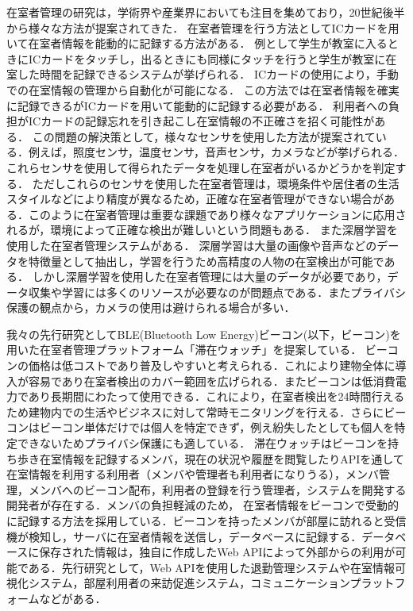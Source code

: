 在室者管理の研究は，学術界や産業界においても注目を集めており，20世紀後半から様々な方法が提案されてきた．
在室者管理を行う方法としてICカードを用いて在室者情報を能動的に記録する方法がある．
例として学生が教室に入るときにICカードをタッチし，出るときにも同様にタッチを行うと学生が教室に在室した時間を記録できるシステムが挙げられる．
ICカードの使用により，手動での在室情報の管理から自動化が可能になる．
この方法では在室者情報を確実に記録できるがICカードを用いて能動的に記録する必要がある．
利用者への負担がICカードの記録忘れを引き起こし在室情報の不正確さを招く可能性がある．
この問題の解決策として，様々なセンサを使用した方法が提案されている．例えば，照度センサ，温度センサ，音声センサ，カメラなどが挙げられる．これらセンサを使用して得られたデータを処理し在室者がいるかどうかを判定する．
ただしこれらのセンサを使用した在室者管理は，環境条件や居住者の生活スタイルなどにより精度が異なるため，正確な在室者管理ができない場合がある．このように在室者管理は重要な課題であり様々なアプリケーションに応用されるが，環境によって正確な検出が難しいという問題もある．
また深層学習を使用した在室者管理システムがある．
深層学習は大量の画像や音声などのデータを特徴量として抽出し，学習を行うため高精度の人物の在室検出が可能である．
しかし深層学習を使用した在室者管理には大量のデータが必要であり，データ収集や学習には多くのリソースが必要なのが問題点である．またプライバシ保護の観点から，カメラの使用は避けられる場合が多い．

我々の先行研究としてBLE(Bluetooth Low Energy)ビーコン(以下，ビーコン)を用いた在室者管理プラットフォーム「滞在ウォッチ」を提案している．
ビーコンの価格は低コストであり普及しやすいと考えられる．これにより建物全体に導入が容易であり在室者検出のカバー範囲を広げられる．またビーコンは低消費電力であり長期間にわたって使用できる．これにより，在室者検出を24時間行えるため建物内での生活やビジネスに対して常時モニタリングを行える．さらにビーコンはビーコン単体だけでは個人を特定できず，例え紛失したとしても個人を特定できないためプライバシ保護にも適している．
滞在ウォッチはビーコンを持ち歩き在室情報を記録するメンバ，現在の状況や履歴を閲覧したりAPIを通して在室情報を利用する利用者（メンバや管理者も利用者になりうる），メンバ管理，メンバへのビーコン配布，利用者の登録を行う管理者，システムを開発する開発者が存在する．メンバの負担軽減のため，
在室者情報をビーコンで受動的に記録する方法を採用している．ビーコンを持ったメンバが部屋に訪れると受信機が検知し，サーバに在室者情報を送信し，データベースに記録する．データベースに保存された情報は，独自に作成したWeb APIによって外部からの利用が可能である．先行研究として，Web APIを使用した退勤管理システムや在室情報可視化システム，部屋利用者の来訪促進システム，コミュニケーションプラットフォームなどがある．


